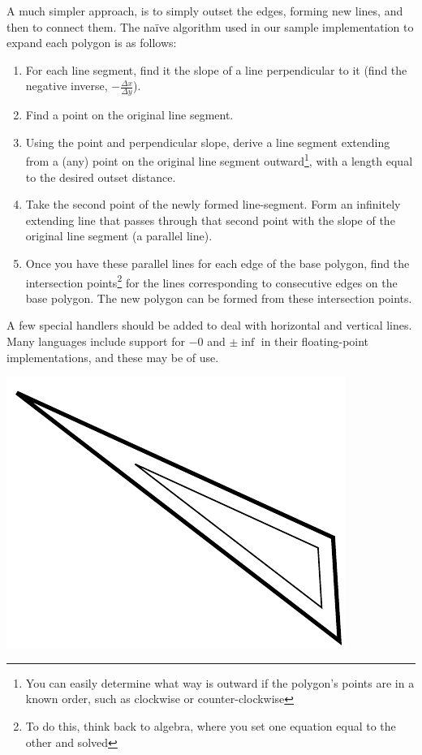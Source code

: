 \documentclass[letterpaper, 12pt]{article}
\begin{document}
\begin{multicols}{2}
A much simpler approach, is to simply outset the edges, forming new lines, and
then to connect them. The na\"ive algorithm used in our sample implementation to
expand each polygon is as follows:

\begin{enumerate}

\item For each line segment, find it the slope of a line perpendicular to it
      (find the negative inverse, \(-\frac{\Delta x}{\Delta y}\)).
\item Find a point on the original line segment.
\item Using the point and perpendicular slope, derive a line segment extending
      from a (any) point on the original line segment outward\footnote{You can
      easily determine what way is outward if the polygon's points are in a
      known order, such as clockwise or counter-clockwise}, with a length equal
      to the desired outset distance.
\item Take the second point of the newly formed line-segment. Form an infinitely
      extending line that passes through that second point with the slope of the
      original line segment (a parallel line).
\item Once you have these parallel lines for each edge of the base polygon, find
      the intersection points\footnote{To do this, think back to algebra, where
      you set one equation equal to the other and solved} for the lines
      corresponding to consecutive edges on the base polygon. The new polygon
      can be formed from these intersection points.

\end{enumerate}

A few special handlers should be added to deal with horizontal and vertical
lines. Many languages include support for \(-0\) and \(\pm\inf\) in their
floating-point implementations, and these may be of use.

\noindent\includegraphics[width=\columnwidth]{img/simple_outset_acute.pdf}


\end{multicols}
\end{document}
